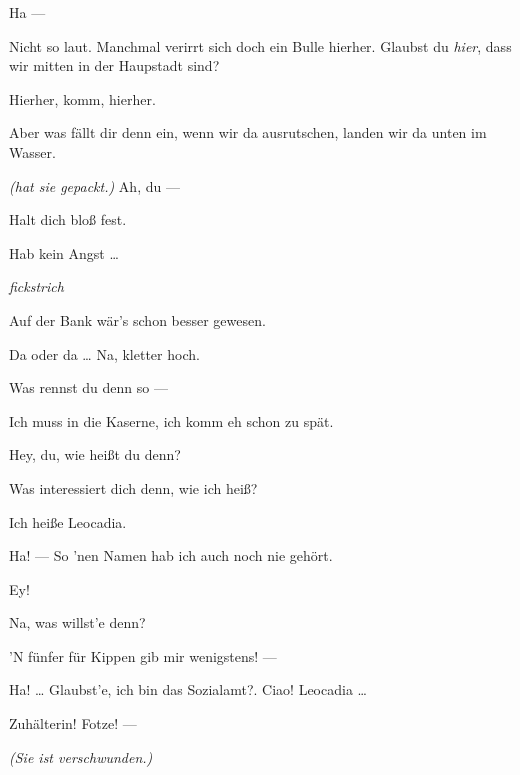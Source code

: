 \documentclass[
	final,
	a4paper,
	ngerman,
	mpinclude = true, %
	twoside = true,
	open = right,
	cleardoublepage = plain,
	DIV = 13,
	BCOR = 1cm,
	titlepage = firstiscover,
	]{scrbook}
\newcommand{\direction}[1]{\textit{(#1)}}
\newcommand{\hiat}{%
	\begin{center}
		\tiny
		\raisebox{0.5ex}{\rule{0.3\linewidth}{0.4pt}}
		\textit{fickstrich}
		\raisebox{0.5ex}{\rule{0.3\linewidth}{0.4pt}}
	\end{center}
}
\newcommand{\thecharacter}[1]{\textup{\textsc{#1}}\xspace}
\newcommand{\thenutte}{\thecharacter{Leocadia}}
\newcommand{\thesoldatin}{\thecharacter{Franziska}}
\newcommand{\character}[1]{\item[#1:]}
\newcommand{\nutte}{\character{\thenutte}}
\newcommand{\soldatin}{\character{\thesoldatin}}
\begin{document}
\begin{play}
	\soldatin
	Ha ---

	\nutte
	Nicht so laut. Manchmal verirrt sich doch ein Bulle hierher. Glaubst du \emph{hier}, dass wir mitten in der Haupstadt sind?

	\soldatin
	Hierher, komm, hierher.

	\nutte
	Aber was fällt dir denn ein, wenn wir da ausrutschen, landen wir da unten im Wasser.

	\soldatin
	\direction{hat sie gepackt.} Ah, du ---

	\nutte
	Halt dich bloß fest.

	\soldatin
	Hab kein Angst \ldots{}

	\hiat

	\nutte
	Auf der Bank wär's schon besser gewesen.

	\soldatin
	Da oder da \ldots{} Na, kletter hoch.

	\nutte
	Was rennst du denn so ---

	\soldatin
	Ich muss in die Kaserne, ich komm eh schon zu spät.

	\nutte
	Hey, du, wie heißt du denn?

	\soldatin
	Was interessiert dich denn, wie ich heiß?

	\nutte
	Ich heiße Leocadia.

	\soldatin
	Ha! --- So 'nen Namen hab ich auch noch nie gehört.

	\nutte
	Ey!

	\soldatin
	Na, was willst'e denn?

	\nutte
	'N fünfer für Kippen gib mir wenigstens! ---

	\soldatin
	Ha! \ldots{} Glaubst'e, ich bin das Sozialamt?. Ciao! Leocadia \ldots{}

	\nutte
	Zuhälterin! Fotze! ---

	\direction{Sie ist verschwunden.}

\end{play}
\end{document}
